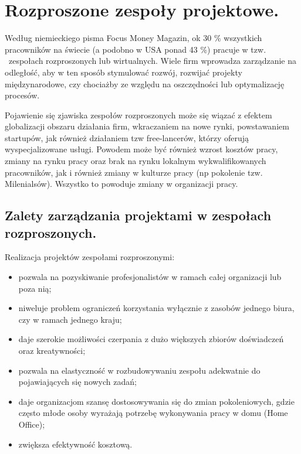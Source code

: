 
\chapter{Rozproszone zespoły projektowe.}

Według niemieckiego pisma Focus Money Magazin,
ok 30 \% wszystkich pracowników na świecie (a podobno w USA ponad 43 \%) pracuje w tzw. \ zespołach rozproszonych lub wirtualnych.
 Wiele firm wprowadza zarządzanie na odległość, aby w ten sposób stymulować rozwój,
rozwijać projekty międzynarodowe, czy chociażby ze względu na oszczędności lub optymalizację procesów.

Pojawienie się zjawiska zespołów rozproszonych może się wiązać z efektem globalizacji obszaru działania firm, wkraczaniem na nowe rynki,
powstawaniem startupów, jak również działaniem tzw free-lancerów, którzy oferują wyspecjalizowane usługi.
Powodem może być również wzrost kosztów pracy, zmiany na rynku pracy oraz brak na rynku lokalnym wykwalifikowanych pracowników,
 jak i również zmiany w kulturze pracy (np pokolenie tzw. Milenialsów). Wszystko to powoduje zmiany w organizacji pracy.

\section{Zalety zarządzania projektami w zespołach rozproszonych.}

Realizacja projektów zespołami rozproszonymi:

\begin{itemize}
	\item pozwala na pozyskiwanie profesjonalistów w ramach całej organizacji lub poza nią;
	\item niweluje problem ograniczeń korzystania wyłącznie z zasobów jednego biura, czy w ramach jednego kraju;
	\item daje szerokie możliwości czerpania z dużo większych zbiorów doświadczeń oraz kreatywności;
	\item pozwala na elastyczność w rozbudowywaniu zespołu adekwatnie do pojawiających się nowych zadań;
	\item daje organizacjom szansę dostosowywania się do zmian pokoleniowych, gdzie często młode osoby wyrażają potrzebę wykonywania pracy w domu (Home Office);
	\item zwiększa efektywność kosztową.
\end{itemize}

